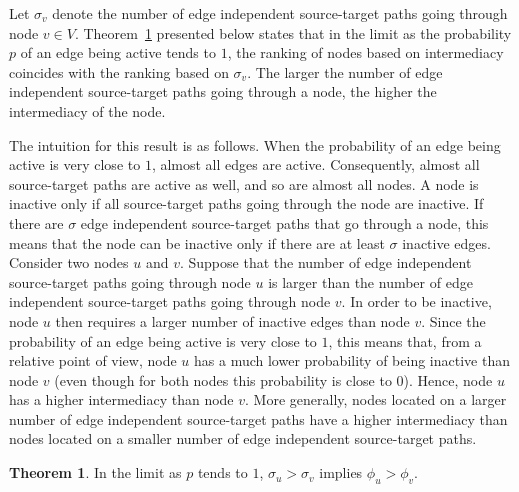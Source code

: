 \documentclass{article}
\theoremstyle{definition}
\newtheorem{theorem}{Theorem}
\newcommand{\theref}[1]{Theorem~\ref{the:#1}\xspace}
\begin{document}
Let $\sigma_v$ denote the number of edge independent source-target paths going through node $v \in V$. \theref{p1} presented below states that in the limit as the probability $p$ of an edge being active tends to $1$, the ranking of nodes based on intermediacy coincides with the ranking based on $\sigma_v$. The larger the number of edge independent source-target paths going through a node, the higher the intermediacy of the node.

The intuition for this result is as follows. When the probability of an edge being active is very close to $1$, almost all edges are active. Consequently, almost all source-target paths are active as well, and so are almost all nodes. A node is inactive only if all source-target paths going through the node are inactive. If there are $\sigma$ edge independent source-target paths that go through a node, this means that the node can be inactive only if there are at least $\sigma$ inactive edges. Consider two nodes $u$ and $v$. Suppose that the number of edge independent source-target paths going through node $u$ is larger than the number of edge independent source-target paths going through node $v$. In order to be inactive, node $u$ then requires a larger number of inactive edges than node $v$. Since the probability of an edge being active is very close to $1$, this means that, from a relative point of view, node $u$ has a much lower probability of being inactive than node $v$ (even though for both nodes this probability is close to $0$). Hence, node $u$ has a higher intermediacy than node $v$. More generally, nodes located on a larger number of edge independent source-target paths have a higher intermediacy than nodes located on a smaller number of edge independent source-target paths.

\begin{theorem}
	In the limit as $p$ tends to $1$, $\sigma_u > \sigma_v$ implies $\phi_u > \phi_v$.
	\label{the:p1}
\end{theorem}
\end{document}
